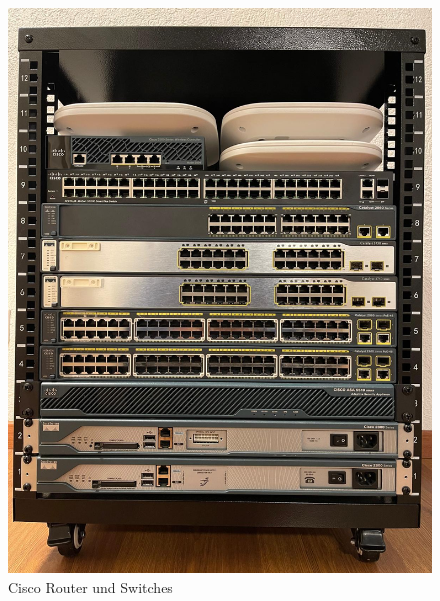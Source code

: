 \documentclass[11pt, a4paper]{awesome-cv}
\begin{document}
\begin{cvletter}
\begin{figure}[h!]
    \centering
    \begin{minipage}{0.48\textwidth} %
        \centering
        \includegraphics[width=\textwidth]{./foto_lab/lab_1.jpg}
        \caption{Cisco Router und Switches}
        \label{fig:lab1}
    \end{minipage}
    \hfill
    \begin{minipage}{0.48\textwidth} %
        \centering

\end{minipage}
\end{figure}
\end{cvletter}
\end{document}
